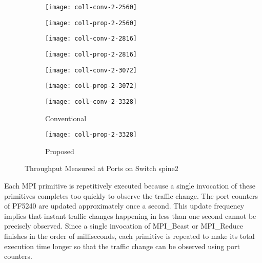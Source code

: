 \begin{figure}
    \begin{subfigure}{.48\linewidth}
        \texttt{[image: coll-conv-2-2560]}
    \end{subfigure}
    \hfill
    \begin{subfigure}{.48\linewidth}
        \texttt{[image: coll-prop-2-2560]}
    \end{subfigure}

    \begin{subfigure}{.48\linewidth}
        \texttt{[image: coll-conv-2-2816]}
    \end{subfigure}
    \hfill
    \begin{subfigure}{.48\linewidth}
        \texttt{[image: coll-prop-2-2816]}
    \end{subfigure}

    \begin{subfigure}{.48\linewidth}
        \texttt{[image: coll-conv-2-3072]}
    \end{subfigure}
    \hfill
    \begin{subfigure}{.48\linewidth}
        \texttt{[image: coll-prop-2-3072]}
    \end{subfigure}

    \begin{subfigure}{.48\linewidth}
        \texttt{[image: coll-conv-2-3328]}
        \caption{Conventional}
    \end{subfigure}
    \hfill
    \begin{subfigure}{.48\linewidth}
        \texttt{[image: coll-prop-2-3328]}
        \caption{Proposed}
    \end{subfigure}

    \caption{Throughput Measured at Ports on Switch spine2}%
    \label{fig:coll-spine2-conv}
\end{figure}

Each MPI primitive is repetitively executed because a single invocation
of these primitives completes too quickly to observe the traffic change.
The port counters of PF5240 are updated approximately once a second.
This update frequency implies that instant traffic changes happening in less
than one second cannot be precisely observed. Since a single invocation of
MPI\_Bcast or MPI\_Reduce finishes in the order of milliseconds, each
primitive is repeated to make its total execution time longer so that the
traffic change can be observed using port counters.

